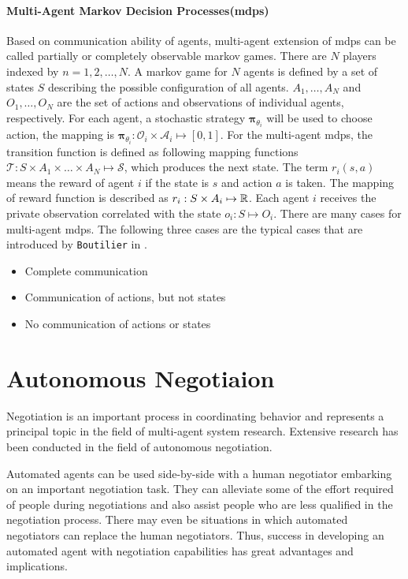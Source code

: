 \paragraph{Multi-Agent Markov Decision Processes(\gls{mdps})} Based on communication ability of agents, multi-agent extension of \gls{mdps} can be called partially or completely observable markov games. There are $N$ players indexed by $n=1,2, \dots ,N$. A markov game for $N$ agents is defined by a set of states $S$ describing the possible configuration of all agents. $A_1, \dots, A_N$ and $O_1, \dots, O_N$ are the set of actions and observations of individual agents, respectively. For each agent, a stochastic strategy $\boldsymbol{\pi}_{\theta_{i}}$ will be used to choose action, the mapping is $\boldsymbol{\pi}_{\theta_{i}}: \mathcal{O}_{i} \times \mathcal{A}_{i} \mapsto[0,1]$. For the multi-agent \gls{mdps}, the transition function is defined as following mapping functions $\mathcal{T}: {S} \times {A}_{1} \times \ldots \times {A}_{N} \mapsto \mathcal{S}$, which produces the next state. The term $r_i(s, a)$ means the reward of agent $i$ if the state is $s$ and action $a$ is taken. The mapping of reward function is described as $r_i: S \times A_i \mapsto \mathbb{R}$. Each agent $i$ receives the private observation correlated with the state $o_i: S \mapsto O_i$\parencite{maddpg2017}. There are many cases for multi-agent \gls{mdps}. The following three cases are the typical cases that are introduced by \texttt{Boutilier} in \parencite{Boutilier1996PlanningLA}.
\begin{itemize}
\item Complete communication
\item Communication of actions, but not states 
\item No communication of actions or states
\end{itemize}

\section{Autonomous Negotiaion} \label{autonomous-negotiation}
Negotiation is an important process in coordinating behavior and represents a principal topic in the field of multi-agent system research. Extensive research has been conducted in the field of autonomous negotiation\parencite{FARATIN1998159, Darja2011, Baarslag2013, L2017NegoSI, Aydoğan2017, Lee2004, Lin2014}.

Automated agents can be used side-by-side with a human negotiator embarking on an important negotiation task. They can alleviate some of the effort required of people during negotiations and also assist people who are less qualified in the negotiation process. There may even be situations in which automated negotiators can replace the human negotiators. Thus, success in developing an automated agent with negotiation capabilities has great advantages and implications\parencite{Baarslag2012}.


